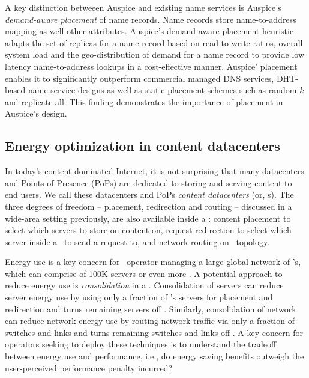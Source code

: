 A key distinction betweeen Auspice and existing name services is Auspice's \emph{demand-aware placement} of name records. Name records store name-to-address mapping as well other attributes. Auspice's demand-aware placement heuristic adapts the set of replicas for a name record based on read-to-write ratios, overall system load and the geo-distribution of demand for a name record to provide low latency name-to-address lookups in a cost-effective manner. Auspice' placement enables it to significantly outperform commercial managed DNS services, DHT-based name service designs as well as static placement schemes such as random-$k$ and replicate-all. This finding demonstrates the importance of placement in Auspice's design.


\subsection{Energy optimization in content datacenters}
\label{sec:intro-cdc}

In today's content-dominated Internet, it is not surprising that many datacenters and Points-of-Presence (PoPs) are dedicated to storing and serving content to end users. We call these datacenters and PoPs {\em content datacenters} (or, \cdc s). The three degrees of freedom -- placement, redirection and routing -- discussed in a wide-area setting previously, are also available inside a \cdc: content placement to select which servers to store on content on, request redirection to select which server inside a \cdc\ to send a request to, and network routing on \cdc\ topology. 

Energy use is a key concern for \cdc\ operator managing a large global network of \cdc's, which can comprise of 100K servers or even more \cite{akamai-facts,qureshi2009cutting}. A potential approach to reduce energy use is \emph{consolidation} in a \cdc. Consolidation of servers can reduce server energy use by using only a fraction of \cdc's servers for placement and redirection and turns remaining servers off \cite{mathew12}. Similarly, consolidation of network can reduce network energy use by routing network traffic via only a fraction of switches and links and turns remaining switches and links off \cite{response}. A key concern for operators seeking to deploy these techniques is to understand the tradeoff between energy use and performance, i.e., do energy saving benefits outweigh the user-perceived performance penalty incurred?


